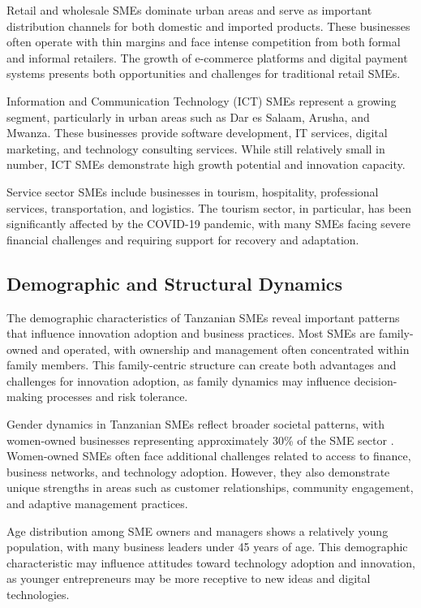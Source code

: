 \documentclass[12pt,a4paper]{article}
\begin{document}
Retail and wholesale SMEs dominate urban areas and serve as important distribution channels for both domestic and imported products. These businesses often operate with thin margins and face intense competition from both formal and informal retailers. The growth of e-commerce platforms and digital payment systems presents both opportunities and challenges for traditional retail SMEs.

Information and Communication Technology (ICT) SMEs represent a growing segment, particularly in urban areas such as Dar es Salaam, Arusha, and Mwanza. These businesses provide software development, IT services, digital marketing, and technology consulting services. While still relatively small in number, ICT SMEs demonstrate high growth potential and innovation capacity.

Service sector SMEs include businesses in tourism, hospitality, professional services, transportation, and logistics. The tourism sector, in particular, has been significantly affected by the COVID-19 pandemic, with many SMEs facing severe financial challenges and requiring support for recovery and adaptation.

\subsection{Demographic and Structural Dynamics}

The demographic characteristics of Tanzanian SMEs reveal important patterns that influence innovation adoption and business practices. Most SMEs are family-owned and operated, with ownership and management often concentrated within family members. This family-centric structure can create both advantages and challenges for innovation adoption, as family dynamics may influence decision-making processes and risk tolerance.

Gender dynamics in Tanzanian SMEs reflect broader societal patterns, with women-owned businesses representing approximately 30\% of the SME sector \cite{tanzania2023gender}. Women-owned SMEs often face additional challenges related to access to finance, business networks, and technology adoption. However, they also demonstrate unique strengths in areas such as customer relationships, community engagement, and adaptive management practices.

Age distribution among SME owners and managers shows a relatively young population, with many business leaders under 45 years of age. This demographic characteristic may influence attitudes toward technology adoption and innovation, as younger entrepreneurs may be more receptive to new ideas and digital technologies.
\end{document}
